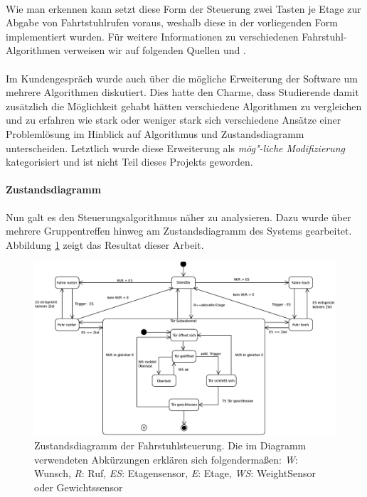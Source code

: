 \paragraph{}Wie man erkennen kann setzt diese Form der Steuerung zwei Tasten je Etage zur Abgabe von Fahrtstuhlrufen voraus, weshalb diese in der vorliegenden Form implementiert wurden. Für weitere Informationen zu verschiedenen Fahrstuhl-Algorithmen verweisen wir auf folgenden Quellen \cite{wiki_elev} und \cite{wiki_elev_2}.

\paragraph{}Im Kundengespräch wurde auch über die mögliche Erweiterung der Software um mehrere Algorithmen diskutiert. Dies hatte den Charme, dass Studierende damit zusätzlich die Möglichkeit gehabt hätten verschiedene Algorithmen zu vergleichen und zu erfahren wie stark oder weniger stark sich verschiedene Ansätze einer Problemlösung im Hinblick auf Algorithmus und Zustandsdiagramm unterscheiden. Letztlich wurde diese Erweiterung als \textit{mög"-liche Modifizierung} kategorisiert und ist nicht Teil dieses Projekts geworden.

\paragraph{Zustandsdiagramm}Nun galt es den Steuerungsalgorithmus näher zu analysieren. Dazu wurde über mehrere Gruppentreffen hinweg am Zustandsdiagramm des Systems gearbeitet. Abbildung \ref{ZD} zeigt das Resultat dieser Arbeit.

\begin{figure}[h]
	\hspace*{-2.0cm}
	\includegraphics[width=1.3\textwidth]{images/ZDv6.eps}
	\caption{Zustandsdiagramm der Fahrstuhlsteuerung. Die im Diagramm verwendeten Abkürzungen erklären sich folgendermaßen: \textit{W}: Wunsch, \textit{R}: Ruf, \textit{ES}: Etagensensor, \textit{E}: Etage, \textit{WS}: WeightSensor oder Gewichtssensor}
	\label{ZD}
\end{figure}

